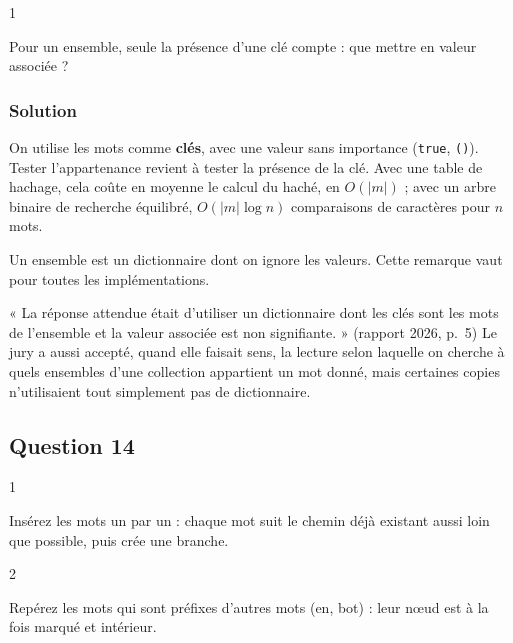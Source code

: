 \documentclass[11pt,a4paper]{article}
\begin{document}
\begin{indication}{1}

Pour un ensemble, seule la présence d'une clé compte : que mettre en valeur associée ?

\end{indication}

\hypertarget{solution-12}{%
\subsubsection{Solution}\label{solution-12}}

On utilise les mots comme \textbf{clés}, avec une valeur sans importance (\texttt{true}, \texttt{()}). Tester l'appartenance revient à tester la présence de la clé. Avec une table de hachage, cela coûte en moyenne le calcul du haché, en \(O(|m|)\) ; avec un arbre binaire de recherche équilibré, \(O(|m| \log n)\) comparaisons de caractères pour \(n\) mots.

\begin{methode}

Un ensemble est un dictionnaire dont on ignore les valeurs. Cette remarque vaut pour toutes les implémentations.

\end{methode}

\begin{jury}

« La réponse attendue était d'utiliser un dictionnaire dont les clés sont les mots de l'ensemble et la valeur associée est non signifiante. » (rapport 2026, p.~5) Le jury a aussi accepté, quand elle faisait sens, la lecture selon laquelle on cherche à quels ensembles d'une collection appartient un mot donné, mais certaines copies n'utilisaient tout simplement pas de dictionnaire.

\end{jury}

\hypertarget{question-14}{%
\subsection{Question 14}\label{question-14}}

\begin{indication}{1}

Insérez les mots un par un : chaque mot suit le chemin déjà existant aussi loin que possible, puis crée une branche.

\end{indication}

\begin{indication}{2}

Repérez les mots qui sont préfixes d'autres mots (en, bot) : leur nœud est à la fois marqué et intérieur.

\end{indication}
\end{document}

